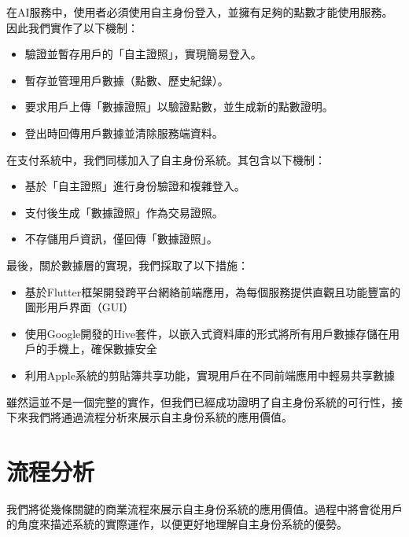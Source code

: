 在AI服務中，使用者必須使用自主身份登入，並擁有足夠的點數才能使用服務。因此我們實作了以下機制：
\begin{itemize}
  \item 驗證並暫存用戶的「自主證照」，實現簡易登入。
  \item 暫存並管理用戶數據（點數、歷史紀錄）。
  \item 要求用戶上傳「數據證照」以驗證點數，並生成新的點數證明。
  \item 登出時回傳用戶數據並清除服務端資料。
\end{itemize}
在支付系統中，我們同樣加入了自主身份系統。其包含以下機制：
\begin{itemize}
  \item 基於「自主證照」進行身份驗證和複雜登入。
  \item 支付後生成「數據證照」作為交易證照。
  \item 不存儲用戶資訊，僅回傳「數據證照」。
\end{itemize}
最後，關於數據層的實現，我們採取了以下措施：
\begin{itemize}
  \item 基於Flutter框架開發跨平台網絡前端應用，為每個服務提供直觀且功能豐富的圖形用戶界面（GUI）
  \item 使用Google開發的Hive套件，以嵌入式資料庫的形式將所有用戶數據存儲在用戶的手機上，確保數據安全
  \item 利用Apple系統的剪貼簿共享功能，實現用戶在不同前端應用中輕易共享數據
\end{itemize}
雖然這並不是一個完整的實作，但我們已經成功證明了自主身份系統的可行性，接下來我們將通過流程分析來展示自主身份系統的應用價值。
\section{流程分析}
我們將從幾條關鍵的商業流程來展示自主身份系統的應用價值。過程中將會從用戶的角度來描述系統的實際運作，以便更好地理解自主身份系統的優勢。

